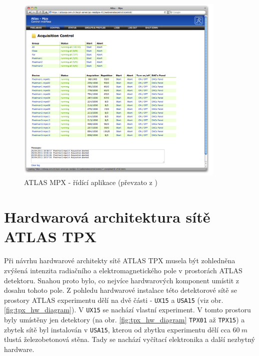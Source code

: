 \begin{figure}[ht]
	\begin{center}
		\includegraphics[width=10cm]{figures/mpx_web.png}
		\caption{ATLAS MPX - řídící aplikace (převzato z \cite{TurecekThesis2011})}
		\label{fig:mpx_web}
	\end{center}
\end{figure}

\section{Hardwarová architektura sítě ATLAS TPX}\label{atlas:hw_arch}
Při návrhu hardwarové architekty sítě ATLAS TPX musela být zohledněna zvýšená intenzita radiačního a elektromagnetického pole v prostorách ATLAS detektoru. Snahou proto bylo, co nejvíce hardwarových komponent umístit z dosahu tohoto pole. Z pohledu hardwarové instalace této detektorové sítě se prostory ATLAS experimentu dělí na dvě části - \texttt{UX15} a \texttt{USA15} (viz obr. \ref{fig:tpx_hw_diagram}). V \texttt{UX15} se nachází vlastní experiment. V tomto prostoru byly umístěny jen detektory (na obr. \ref{fig:tpx_hw_diagram} \texttt{TPX01} až \texttt{TPX15}) a zbytek sítě byl instalován v \texttt{USA15}, kterou od zbytku experimentu dělí cca $60~m$ tlustá železobetonová stěna. Tady se nachází vyčítací elektronika a další nezbytný hardware.

